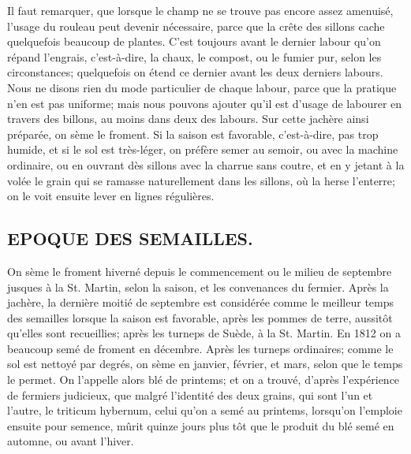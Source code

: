 Il faut remarquer, que lorsque le champ ne se trouve pas encore assez amenuisé, l'usage du rouleau peut devenir nécessaire, parce que la crête des sillons cache quelquefois beaucoup de plantes. C'est toujours avant le dernier labour qu'on répand l'engrais, c'est-à-dire, la chaux, le compost, ou le fumier pur, selon les circonstances; quelquefois on étend ce dernier avant les deux derniers labours. Nous ne disons rien du mode particulier de chaque labour, parce que la pratique n'en est pas uniforme; mais nous pouvons ajouter qu'il est d'usage de labourer en travers des billons, au moins dans deux des labours.\setcounter{page}{112} Sur cette jachère ainsi préparée, on sème le froment. Si la saison est favorable, c'est-à-dire, pas trop humide, et si le sol est très-léger, on préfère semer au semoir, ou avec la machine ordinaire, ou en ouvrant dès sillons avec la charrue sans coutre, et en y jetant à la volée le grain qui se ramasse naturellement dans les sillons, où la herse l'enterre; on le voit ensuite lever en lignes régulières.
\subsection{EPOQUE DES SEMAILLES.}
On sème le froment hiverné depuis le commencement ou le milieu de septembre jusques à la St. Martin, selon la saison, et les convenances du fermier. Après la jachère, la dernière moitié de septembre est considérée comme le meilleur temps des semailles lorsque la saison est favorable, après les pommes de terre, aussitôt qu'elles sont recueillies; après les turneps de Suède, à la St. Martin. En 1812 on a beaucoup semé de froment en décembre. Après les turneps ordinaires; comme le sol est nettoyé par degrés, on sème en janvier, février, et mars, selon que le temps le permet. On l'appelle alors blé de printems; et on a trouvé, d'après l'expérience de fermiers judicieux, que malgré l'identité des deux grains, qui sont l'un et l'autre, le triticum hybernum, celui qu'on a semé au printems,\setcounter{page}{113} lorsqu'on l'emploie ensuite pour semence, mûrit quinze jours plus tôt que le produit du blé semé en automne, ou avant l'hiver.
